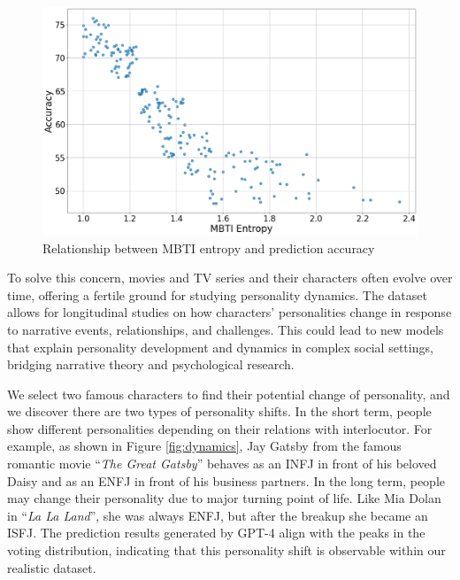 \begin{figure}
    \centering
    \includegraphics[width=\linewidth]{images/Scatter.png}
    \caption{Relationship between MBTI entropy and prediction accuracy}
    \label{fig:scatter}
\end{figure}

To solve this concern, movies and TV series and their characters often evolve over time, offering a fertile ground for studying personality dynamics. The dataset allows for longitudinal studies on how characters' personalities change in response to narrative events, relationships, and challenges. This could lead to new models that explain personality development and dynamics in complex social settings, bridging narrative theory and psychological research. 

We select two famous characters to find their potential change of personality, and we discover there are two types of personality shifts. In the short term, people show different personalities depending on their relations with interlocutor. For example, as shown in Figure \ref{fig:dynamics}, Jay Gatsby from the famous romantic movie ``\textit{The Great Gatsby}'' behaves as an INFJ in front of his beloved Daisy and as an ENFJ in front of his business partners. In the long term, people may change their personality due to major turning point of life. Like Mia Dolan in ``\textit{La La Land}'', she was always ENFJ, but after the breakup she became an ISFJ. The prediction results generated by GPT-4 align with the peaks in the voting distribution, indicating that this personality shift is observable within our realistic dataset.

